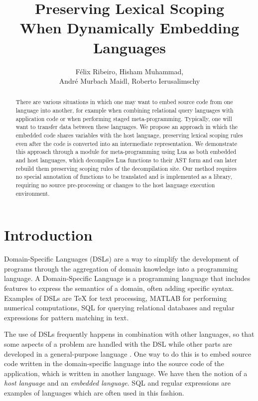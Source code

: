 \documentclass[english]{llncs}
\title{Preserving Lexical Scoping\\
When Dynamically Embedding Languages}
\author{
Félix Ribeiro,
Hisham Muhammad,\\
André Murbach Maidl,
Roberto Ierusalimschy
}
\institute{
Department of Computer Science --
PUC-Rio -- Rio de Janeiro -- Brazil
\email{\{fribeiro,hisham,amaidl,roberto\}@inf.puc-rio.br}
}
\begin{document}
\maketitle

\begin{abstract}

There are various situations in which one may want to embed source code from
one language into another, for example when combining relational query
languages with application code or when performing staged meta-programming.
Typically, one will want to transfer data between these languages.
We propose an approach in which the embedded code shares variables with the
host language, preserving lexical scoping rules even after the code is
converted into an intermediate representation. We demonstrate this approach
through a module for meta-programming using Lua as both embedded and host
languages, which decompiles Lua functions to their AST form and can later
rebuild them preserving scoping rules of the decompilation site. Our method
requires no special annotation of functions to be translated and is
implemented as a library, requiring no source pre-processing or changes to
the host language execution environment.

\end{abstract}

\section{Introduction}
\label{sec:introduction}


Domain-Specific Languages (DSLs) are a way to simplify the development
of programs through the aggregation of domain knowledge into a
programming language.
A Domain-Specific Language is a programming language that
includes features to express the semantics of a domain,
often adding specific syntax.
Examples of DSLs are \TeX{} for text processing, MATLAB for performing
numerical computations, SQL for querying relational databases and
regular expressions for pattern matching in text.

The use of DSLs frequently happens in combination with other languages, so
that some aspects of a problem are handled with the DSL while other parts are
developed in a general-purpose language \cite{Fowler:2010:DSL:1809745}. One
way to do this is to embed source code written in the domain-specific language
into the source code of the application, which is written in another language.
We have then the notion of a \emph{host language} and an \emph{embedded language}.
SQL and regular expressions are examples of languages which are often used in this fashion.
\end{document}
